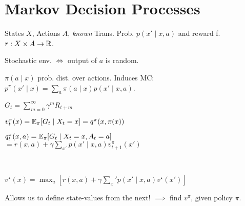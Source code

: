 \section{Markov Decision Processes}

\begin{definition}[MDP]
    States \(X\), Actions \(A\), \textit{\color{H2} known} Trans. Prob. \(p(x' \mid x, a)\) and reward f. \(r: X \times A \to \mathbb{R}\).
\end{definition}
\begin{center}
    Stochastic env. \(\iff\) output of \(a\) is random.
\end{center}

\begin{definition}[Policy]
    \(\pi(a \mid x)\) prob. dist. over actions. Induces MC:
    \(p^\pi(x'\mid x) = \sum_a \pi(a \mid x) p(x' \mid x, a)\).
\end{definition}

\begin{definition}
    \(G_t = \sum_{m=0}^\infty \gamma^m R_{t + m}\)
\end{definition}

\begin{definition}[St. V. F.]
    \(v_t^\pi(x) = \mathbb{E}_\pi[G_t \mid X_t = x] = q^\pi(x, \pi(x))\)
\end{definition}

\begin{definition}[St. V-A./Q]
    \(q_t^\pi(x, a) = \mathbb{E}_\pi[G_t \mid X_t = x, A_t = a]\) \\ \(= r(x, a) + \gamma \sum_{x'}p(x' \mid x, a) v_{t+1}^\pi(x')\)
\end{definition}

\begin{definition} \, \\
    \begin{enumerate*}
        \item {}
        \item {}
        \item {}
        \item \(v^\star(x) = \max_a[r(x, a) + \gamma \sum_x' p(x' \mid x, a) v^\star(x')]\)
    \end{enumerate*}

    { \color{H1} Allows us to define state-values from the next!} \(\implies\) find \(v^\pi\), given policy \(\pi\).
\end{definition}

